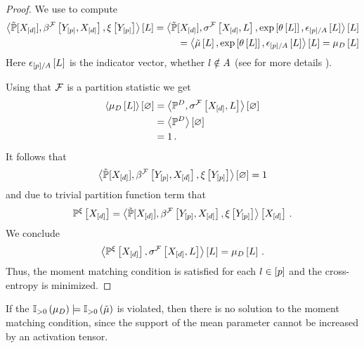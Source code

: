 \begin{proof}
    We use  to compute
    \begin{align*}
        \left\langle \tilde{\mathbb{P}}[X_{[d]}],\beta^{\mathcal{F}}\left[Y_{[p]},X_{[d]}\right],\xi\left[Y_{[p]}\right]\right\rangle \left[ L \right]
        = \left\langle \tilde{\mathbb{P}}[X_{[d]}],\sigma^{\mathcal{F}}\left[X_{[d]},L\right],\mathrm{exp}\left[\theta\left[L\right]\right],\epsilon_{[p]/A}\left[L\right]\right\rangle \left[ L \right] \\
        = \left\langle \tilde{\mu}\left[L\right],\mathrm{exp}\left[\theta\left[L\right]\right],\epsilon_{[p]/A}\left[L\right]\right\rangle \left[ L \right]
        = \mu_{D}\left[L\right]
    \end{align*}
    Here $\epsilon_{[p]/A}\left[L\right]$ is the indicator vector, whether $l\notin A$ (see for more details ).

    Using that $\mathcal{F}$ is a partition statistic we get
    \begin{align*}
        \left\langle \mu_{D}\left[L\right]\right\rangle \left[ \varnothing \right]
        &= \left\langle \mathbb{P}^{D},\sigma^{\mathcal{F}}\left[X_{[d]},L\right]\right\rangle \left[ \varnothing \right] \\
        &= \left\langle \mathbb{P}^{D}\right\rangle \left[ \varnothing \right] \\
        &= 1 \, .
    \end{align*}
    It follows that
    \begin{align*}
        \left\langle \tilde{\mathbb{P}}[X_{[d]}],\beta^{\mathcal{F}}\left[Y_{[p]},X_{[d]}\right],\xi\left[Y_{[p]}\right]\right\rangle \left[ \varnothing \right] = 1
    \end{align*}
    and due to trivial partition function term that
    \begin{align*}
        \mathbb{P}^{\xi}\left[X_{[d]}\right] = \left\langle \tilde{\mathbb{P}}[X_{[d]}],\beta^{\mathcal{F}}\left[Y_{[p]},X_{[d]}\right],\xi\left[Y_{[p]}\right]\right\rangle \left[ X_{[d]} \right] \, .
    \end{align*}
    We conclude
    \begin{align*}
        \left\langle \mathbb{P}^{\xi}\left[X_{[d]}\right],\sigma^{\mathcal{F}}\left[X_{[d]},L\right]\right\rangle \left[ L \right]
        = \mu_{D}\left[L\right] \, .
    \end{align*}
    Thus, the moment matching condition is satisfied for each $l\in[p]$ and the cross-entropy is minimized.
\end{proof}

If the $\mathbb{I}_{>0}\left(\mu_{D}\right)\models\mathbb{I}_{>0}\left(\tilde{\mu}\right)$ is violated, then there is no solution to the moment matching condition, since the support of the mean parameter cannot be increased by an activation tensor.

